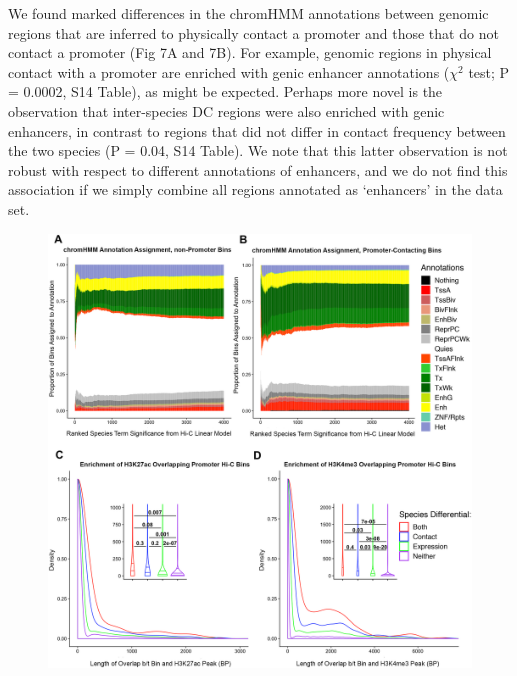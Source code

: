 We found marked differences in the chromHMM annotations between genomic regions that are inferred to physically contact a promoter and those that do not contact a promoter (Fig 7A and 7B). For example, genomic regions in physical contact with a promoter are enriched with genic enhancer annotations ($\chi^2$ test; P = 0.0002, S14 Table), as might be expected. Perhaps more novel is the observation that inter-species DC regions were also enriched with genic enhancers, in contrast to regions that did not differ in contact frequency between the two species (P = 0.04, S14 Table). We note that this latter observation is not robust with respect to different annotations of enhancers, and we do not find this association if we simply combine all regions annotated as `enhancers' in the data set.

\begin{figure}
\centering
\includegraphics[width=6in]{img/fig7.PNG}

\end{figure}
